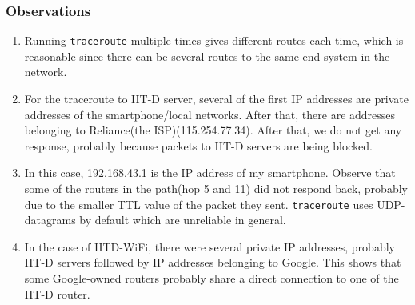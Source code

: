 \documentclass[a4paper]{article}
\begin{document}
\subsubsection{Observations}
\begin{enumerate}
    \item Running \texttt{traceroute} multiple times gives different routes each time, which is reasonable since there can be several routes to the same end-system in the network.
    \item For the traceroute to IIT-D server, several of the first IP addresses are private addresses of the smartphone/local networks. After that, there are addresses belonging to Reliance(the ISP)(115.254.77.34). After that, we do not get any response, probably because packets to IIT-D servers are being blocked.
    \item In this case, 192.168.43.1 is the IP address of my smartphone. Observe that some of the routers in the path(hop 5 and 11) did not respond back, probably due to the smaller TTL value of the packet they sent. \texttt{traceroute} uses UDP-datagrams by default which are unreliable in general.
    \item In the case of IITD-WiFi, there were several private IP addresses, probably IIT-D servers followed by IP addresses belonging to Google. This shows that some  Google-owned routers probably share a direct connection to one of the IIT-D router.
\end{enumerate}
\end{document}
